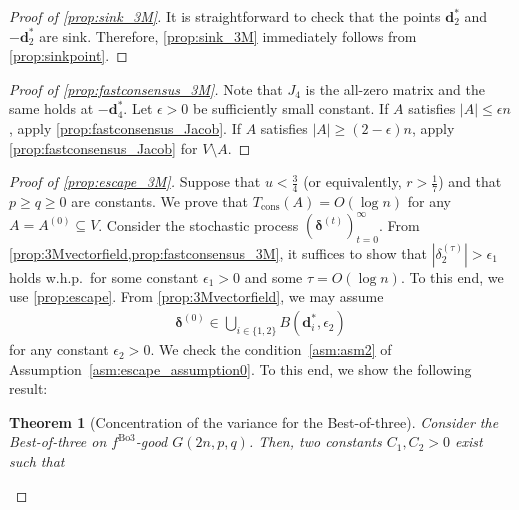\documentclass[letterpaper,11pt]{article}
\newtheorem{theorem}{Theorem}[section]
\newcommand{\Tcons}{T_{\mathrm{cons}}}
\newcommand{\Bthree}{\mathrm{Bo3}}
\begin{document}
\begin{proof}[Proof of \cref{prop:sink_3M}]
It is straightforward to check that the points $\mathbf{d}^*_2$ and $-\mathbf{d}^*_2$ are sink.
Therefore, \cref{prop:sink_3M} immediately follows from \cref{prop:sinkpoint}.
\end{proof}


\begin{proof}[Proof of \cref{prop:fastconsensus_3M}]
Note that $J_4$ is the all-zero matrix and the same holds at $-\mathbf{d}^*_4$.
Let $\epsilon>0$ be sufficiently small constant.
If $A$ satisfies $|A|\leq \epsilon n$, apply \cref{prop:fastconsensus_Jacob}.
If $A$ satisfies $|A|\geq (2-\epsilon)n$, apply \cref{prop:fastconsensus_Jacob} for $V\setminus A$.
\end{proof}


\begin{proof}[Proof of \cref{prop:escape_3M}]
Suppose that $u<\frac{3}{4}$ (or equivalently, $r>\frac{1}{7}$) and that $p\geq q\geq 0$ are constants.
We prove that $\Tcons(A)=O(\log n)$ for any $A=A^{(0)}\subseteq V$.
Consider the stochastic process $({\boldsymbol \delta}^{(t)})_{t=0}^\infty$.
From \cref{prop:3Mvectorfield,prop:fastconsensus_3M}, it suffices to show that $|\delta_2^{(\tau)}|>\epsilon_1$ holds w.h.p.~for some constant $\epsilon_1>0$ and some $\tau=O(\log n)$.
To this end, we use \cref{prop:escape}.
From \cref{prop:3Mvectorfield}, we may assume
\begin{align}
{\boldsymbol \delta}^{(0)}\in \bigcup_{i\in\{1,2\}}B(\mathbf{d}^*_i,\epsilon_2) \label{eqn:initial_assumption}
\end{align}
for any constant $\epsilon_2>0$.
We check the condition~\ref{asm:asm2} of Assumption~\ref{asm:escape_assumption0}.
To this end, we show the following result:
\begin{theorem}[Concentration of the variance for the Best-of-three]  \label{thm:mainthm_Var}
Consider the Best-of-three on $f^{\Bthree}$-good $G(2n,p,q)$.
Then, two constants $C_1,C_2>0$ exist such that %


\end{theorem}
\end{proof}
\end{document}
